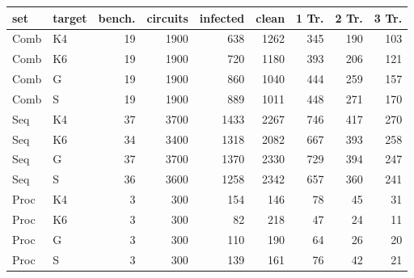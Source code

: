 \begin{tabular}{@{}llrrrrrrr@{}}
\toprule
set & target & bench. & circuits & infected & clean & 1 Tr. & 2 Tr. & 3 Tr. \\
\midrule
Comb & K4 & 19 & 1900 & 638 & 1262 & 345 & 190 & 103 \\
Comb & K6 & 19 & 1900 & 720 & 1180 & 393 & 206 & 121 \\
Comb & G & 19 & 1900 & 860 & 1040 & 444 & 259 & 157 \\
Comb & S & 19 & 1900 & 889 & 1011 & 448 & 271 & 170 \\
\midrule
Seq & K4 & 37 & 3700 & 1433 & 2267 & 746 & 417 & 270 \\
Seq & K6 & 34 & 3400 & 1318 & 2082 & 667 & 393 & 258 \\
Seq & G & 37 & 3700 & 1370 & 2330 & 729 & 394 & 247 \\
Seq & S & 36 & 3600 & 1258 & 2342 & 657 & 360 & 241 \\
\midrule
Proc & K4 & 3 & 300 & 154 & 146 & 78 & 45 & 31 \\
Proc & K6 & 3 & 300 & 82 & 218 & 47 & 24 & 11 \\
Proc & G & 3 & 300 & 110 & 190 & 64 & 26 & 20 \\
Proc & S & 3 & 300 & 139 & 161 & 76 & 42 & 21 \\
\bottomrule
\end{tabular}
